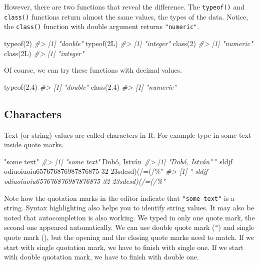 \documentclass[
]{book}
\newenvironment{Shaded}{\begin{snugshade}}{\end{snugshade}}
\newcommand{\CommentTok}[1]{\textcolor[rgb]{0.56,0.35,0.01}{\textit{#1}}}
\newcommand{\DecValTok}[1]{\textcolor[rgb]{0.00,0.00,0.81}{#1}}
\newcommand{\FloatTok}[1]{\textcolor[rgb]{0.00,0.00,0.81}{#1}}
\newcommand{\FunctionTok}[1]{\textcolor[rgb]{0.00,0.00,0.00}{#1}}
\newcommand{\NormalTok}[1]{#1}
\newcommand{\StringTok}[1]{\textcolor[rgb]{0.31,0.60,0.02}{#1}}
\begin{document}
However, there are two functions that reveal the difference. The \texttt{typeof()} and \texttt{class()} functions return almost the same values, the types of the data. Notice, the \texttt{class()} function with double argument returns \texttt{"numeric"}.

\begin{Shaded}
\begin{Highlighting}[]
\FunctionTok{typeof}\NormalTok{(}\DecValTok{2}\NormalTok{)}
\CommentTok{\#\textgreater{} [1] "double"}
\FunctionTok{typeof}\NormalTok{(2L)}
\CommentTok{\#\textgreater{} [1] "integer"}
\FunctionTok{class}\NormalTok{(}\DecValTok{2}\NormalTok{)}
\CommentTok{\#\textgreater{} [1] "numeric"}
\FunctionTok{class}\NormalTok{(2L)}
\CommentTok{\#\textgreater{} [1] "integer"}
\end{Highlighting}
\end{Shaded}

Of course, we can try these functions with decimal values.

\begin{Shaded}
\begin{Highlighting}[]
\FunctionTok{typeof}\NormalTok{(}\FloatTok{2.4}\NormalTok{)}
\CommentTok{\#\textgreater{} [1] "double"}
\FunctionTok{class}\NormalTok{(}\FloatTok{2.4}\NormalTok{)}
\CommentTok{\#\textgreater{} [1] "numeric"}
\end{Highlighting}
\end{Shaded}

\hypertarget{characters}{%
\subsection{Characters}\label{characters}}

Text (or string) values are called characters in R. For example type in some text inside quote marks.

\begin{Shaded}
\begin{Highlighting}[]
\StringTok{"some text"}
\CommentTok{\#\textgreater{} [1] "some text"}
\StringTok{\textquotesingle{}Dobó, István\textquotesingle{}}
\CommentTok{\#\textgreater{} [1] "Dobó, István"}
\StringTok{" sldjf odiuoiuoiu657676876987876875  32 23sdcsd)(/=(/\%"}
\CommentTok{\#\textgreater{} [1] " sldjf odiuoiuoiu657676876987876875  32 23sdcsd)(/=(/\%"}
\end{Highlighting}
\end{Shaded}

Note how the quotation marks in the editor indicate that \texttt{"some\ text"} is a string. Syntax highlighting also helps you to identify string values. It may also be noted that autocompletion is also working. We typed in only one quote mark, the second one appeared automatically. We can use double quote mark (\texttt{"}) and single quote mark (\texttt{\textquotesingle{}}), but the opening and the closing quote marks need to match. If we start with single quotation mark, we have to finish with single one. If we start with double quotation mark, we have to finish with double one.
\end{document}
